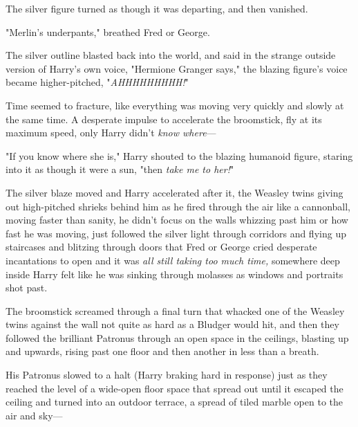 The silver figure turned as though it was departing, and then vanished.

"Merlin's underpants," breathed Fred or George.

The silver outline blasted back into the world, and said in the strange outside
version of Harry's own voice, "Hermione Granger says," the blazing figure's
voice became higher-pitched, "\emph{AHHHHHHHHH!}"

Time seemed to fracture, like everything was moving very quickly and slowly at
the same time. A desperate impulse to accelerate the broomstick, fly at its
maximum speed, only Harry didn't \emph{know where}—

"If you know where she is," Harry shouted to the blazing humanoid figure,
staring into it as though it were a sun, "then \emph{take me to her!}"

The silver blaze moved and Harry accelerated after it, the Weasley twins giving
out high-pitched shrieks behind him as he fired through the air like a
cannonball, moving faster than sanity, he didn't focus on the walls whizzing
past him or how fast he was moving, just followed the silver light through
corridors and flying up staircases and blitzing through doors that Fred or
George cried desperate incantations to open and it was \emph{all still taking
too much time,} somewhere deep inside Harry felt like he was sinking through
molasses as windows and portraits shot past.

The broomstick screamed through a final turn that whacked one of the Weasley
twins against the wall not quite as hard as a Bludger would hit, and then they
followed the brilliant Patronus through an open space in the ceilings, blasting
up and upwards, rising past one floor and then another in less than a breath.

His Patronus slowed to a halt (Harry braking hard in response) just as they
reached the level of a wide-open floor space that spread out until it
escaped the ceiling and turned into an outdoor terrace, a spread of tiled
marble open to the air and sky—

